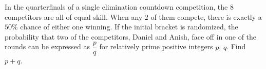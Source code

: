 In the quarterfinals of a single elimination countdown competition, the $8$ competitors are all of equal skill. When any $2$ of them compete, there is exactly a $50\%$ chance of either one winning. If the initial bracket is randomized, the probability that two of the competitors, Daniel and Anish, face off in one of the rounds can be expressed as $\dfrac{p}{q}$ for relatively prime positive integers $p$, $q$. Find $p + q$.
